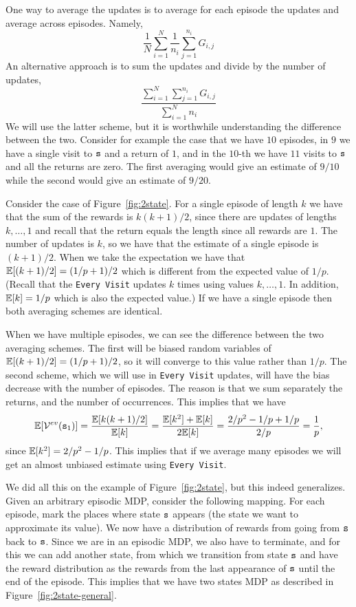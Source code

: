 \begin{advanced}
One way to average the updates is to average for each episode the
updates and average across episodes. Namely,
\[
\frac{1}{N}\sum_{i=1}^N \frac{1}{n_i} \sum_{j=1}^{n_i} G_{i,j}
\]
An alternative approach is to sum the updates and divide by the
number of updates,
\[
\frac{\sum_{i=1}^N\sum_{j=1}^{n_i} G_{i,j}}{\sum_{i=1}^N n_i}
\]
We will use the latter scheme, but it is worthwhile understanding
the difference between the two. Consider for example the case that
we have $10$ episodes, in $9$ we have a single visit to ${\tt s}$ and
a return of $1$, and in the $10$-th we have $11$ visits to ${\tt s}$
and all the returns are zero. The first averaging would give an
estimate of $9/10$ while the second would give an estimate of
$9/20$.

Consider the case of Figure~\ref{fig:2state}. For a single episode
of length $k$ we have that the sum of the rewards is $k(k+1)/2$,
since there are updates of lengths $k, \ldots , 1$ and recall that
the return equals the length since all rewards are $1$. The number
of updates is $k$, so we have that the estimate of a single episode
is $(k+1)/2$. When we take the expectation we have that
$\mathbb{E}[(k+1)/2]=(1/p+1)/2$ which is different from the expected value of
$1/p$. (Recall that the {\tt Every Visit} updates $k$ times using
values $k,\ldots,1$. In addition, $\mathbb{E}[k]=1/p$ which is also the
expected value.) If we have a single episode then both averaging
schemes are identical.

When we have multiple episodes, we can see the difference between
the two averaging schemes. The first will be biased random variables
of $\mathbb{E}[(k+1)/2]=(1/p+1)/2$, so it will converge to this value rather
than $1/p$. The second scheme, which we will use in {\tt Every
Visit} updates, will have the bias decrease with the number of
episodes. The reason is that we sum separately the returns, and the
number of occurrences. This implies that we have
\[
\mathbb{E}[\mathcal{V}^{ev}({\tt s}_1)]=\frac{\mathbb{E}[k(k+1)/2]}{\mathbb{E}[k]}=\frac{\mathbb{E}[k^2]+\mathbb{E}[k]}{2\mathbb{E}[k]}=
\frac{2/p^2-1/p+1/p}{2/p}=\frac{1}{p},
\]
since $\mathbb{E}[k^2]=2/p^2-1/p$. This implies that if we average many
episodes we will get an almost unbiased estimate using {\tt Every
Visit}.

We did all this on the example of Figure~\ref{fig:2state}, but this
indeed generalizes. Given an arbitrary episodic MDP, consider the
following mapping. For each episode, mark the places where state
${\tt s}$ appears (the state we want to approximate its value). We
now have a distribution of rewards from going from ${\tt s}$ back to
${\tt s}$. Since we are in an episodic MDP, we also have to
terminate, and for this we can add another state, from which we
transition from state ${\tt s}$ and have the reward distribution as
the rewards from the last appearance of ${\tt s}$ until the end of
the episode.
This implies that we have two states MDP as described in
Figure~\ref{fig:2state-general}.



\end{advanced}
